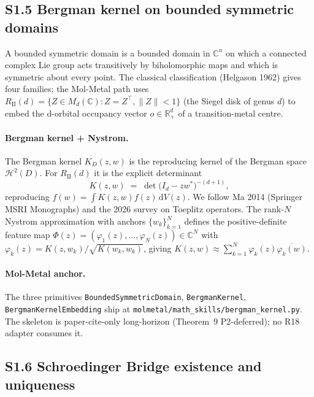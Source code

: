 \subsection*{S1.5 Bergman kernel on bounded symmetric domains}
\label{supp:s1-bergman}

A bounded symmetric domain is a bounded domain in $\mathbb{C}^{n}$
on which a connected complex Lie group acts transitively by
biholomorphic maps and which is symmetric about every point.  The
classical classification (Helgason 1962) gives four families; the
Mol-Metal path uses $R_{\mathrm{II}}(d) = \{ Z \in M_{d}(\mathbb{C}) :
Z = Z^{\top}, \| Z \| < 1 \}$ (the Siegel disk of genus $d$) to
embed the d-orbital occupancy vector $o \in \mathbb{R}^{d}_{+}$ of
a transition-metal centre.

\paragraph{Bergman kernel + Nystrom.}
The Bergman kernel $K_{D}(z, w)$ is the reproducing kernel of the
Bergman space $\mathcal{H}^{2}(D)$.  For $R_{\mathrm{II}}(d)$ it is
the explicit determinant
\begin{equation}
  \label{eq:bergman-r2}
  K(z, w) \;=\; \det\!\bigl( I_{d} - z w^{\ast} \bigr)^{-(d+1)},
\end{equation}
reproducing $f(w) = \int K(z, w) f(z) \,\mathrm{d}V(z)$.  We follow
Ma 2014 (Springer MSRI Monographs) and the 2026 survey on
Toeplitz operators.  The rank-$N$ Nystrom approximation with
anchors $\{w_{k}\}_{k=1}^{N}$ defines the positive-definite feature
map $\Phi(z) = (\varphi_{1}(z), \ldots, \varphi_{N}(z)) \in
\mathbb{C}^{N}$ with
$\varphi_{k}(z) = K(z, w_{k}) / \sqrt{K(w_{k}, w_{k})}$, giving
$K(z, w) \approx \sum_{k=1}^{N} \varphi_{k}(z) \overline{ \varphi_{k}(w) }$.

\paragraph{Mol-Metal anchor.}
The three primitives \texttt{BoundedSymmetricDomain},
\texttt{BergmanKernel}, \texttt{BergmanKernelEmbedding} ship at
\texttt{molmetal/math\_skills/bergman\_kernel.py}.  The skeleton
is paper-cite-only long-horizon (Theorem~9 P2-deferred); no R18
adapter consumes it.

\subsection*{S1.6 Schroedinger Bridge existence and uniqueness}
\label{supp:s1-sb}

